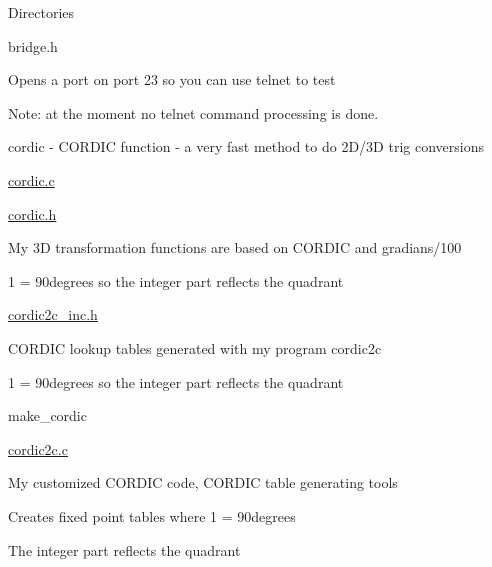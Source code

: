\begin{DoxyParagraph}{Directories}
\begin{DoxyItemize}
\begin{DoxyItemize}
\begin{DoxyItemize}
\item bridge.\+h
\begin{DoxyItemize}
\item Opens a port on port 23 so you can use telnet to test
\begin{DoxyItemize}
\item Note\+: at the moment no telnet command processing is done.
\end{DoxyItemize}
\end{DoxyItemize}
\end{DoxyItemize}
\end{DoxyItemize}
\end{DoxyItemize}
\end{DoxyParagraph}

\begin{DoxyItemize}
\item cordic -\/ C\+O\+R\+D\+IC function -\/ a very fast method to do 2\+D/3D trig conversions
\begin{DoxyItemize}
\item \hyperlink{cordic_8c}{cordic.\+c}
\item \hyperlink{cordic_8h}{cordic.\+h}
\begin{DoxyItemize}
\item My 3D transformation functions are based on C\+O\+R\+D\+IC and gradians/100
\item 1 = 90degrees so the integer part reflects the quadrant
\end{DoxyItemize}
\item \hyperlink{cordic2c__inc_8h}{cordic2c\+\_\+inc.\+h}
\begin{DoxyItemize}
\item C\+O\+R\+D\+IC lookup tables generated with my program cordic2c
\item 1 = 90degrees so the integer part reflects the quadrant
\end{DoxyItemize}
\item make\+\_\+cordic
\begin{DoxyItemize}
\item \hyperlink{cordic2c_8c}{cordic2c.\+c}
\begin{DoxyItemize}
\item My customized C\+O\+R\+D\+IC code, C\+O\+R\+D\+IC table generating tools
\item Creates fixed point tables where 1 = 90degrees
\begin{DoxyItemize}
\item The integer part reflects the quadrant
\end{DoxyItemize}

\end{DoxyItemize}
\end{DoxyItemize}
\end{DoxyItemize}
\end{DoxyItemize}
